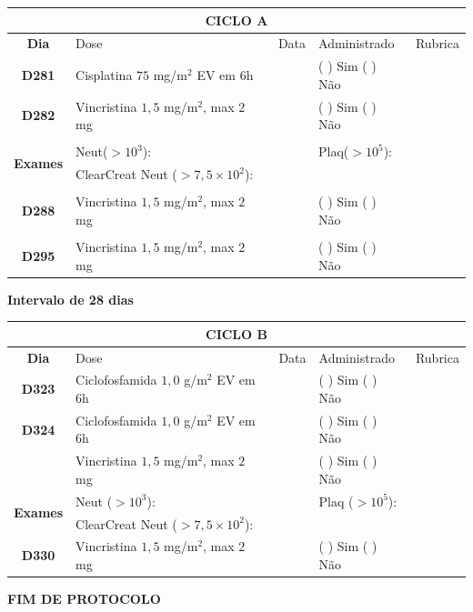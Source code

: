 \documentclass[11pt,a4paper,oldfontcommands]{memoir}
\begin{document}
\begin{center}
\begin{longtable}{p{1cm}p{6cm}|p{1cm}|p{3cm}|p{2.5cm}}
	\hline
	\multicolumn{5}{c}{\textbf{CICLO A}}\\
\hline
    \multicolumn{1}{c|}{\multirow{1}{*}{\textbf{Dia}}}&{Dose}&{Data}&{Administrado}&{Rubrica} \\
    \hline
    \multicolumn{1}{c|}{\multirow{1}{*}{\textbf{D281}}}&{Cisplatina \(75\) mg/m\(^2\) EV em 6h}&&{(  ) Sim (  ) Não}&\\
    \multicolumn{1}{c|}{\multirow{1}{*}{\textbf{D282}}}&{Vincristina \(1,5\) mg/m\(^2\), max \(2\) mg}&&{(  ) Sim (  ) Não}&\\
    \multicolumn{1}{c|}{\multirow{1}{*}{\textbf{}}}&&&&\\
    \hline
    \multicolumn{1}{c|}{\multirow{2}{*}{\textbf{Exames}}}&\multicolumn{2}{l|}{Neut(\(>10^3\)):}&{Plaq(\(>10^5\)):}&\\
    \cline{2-5}
    \multicolumn{1}{c|}{\multirow{2}{*}{{}}}&\multicolumn{2}{l|}{ClearCreat Neut (\(>7,5\times10^2\)):}&{}&{}\\
    \hline
    \\
    \hline
    \multicolumn{1}{c|}{\multirow{1}{*}{\textbf{D288}}}&{Vincristina \(1,5\) mg/m\(^2\), max \(2\) mg}&&{(  ) Sim (  ) Não}&\\
    \hline
    \\
    \hline
    \multicolumn{1}{c|}{\multirow{1}{*}{\textbf{D295}}}&{Vincristina \(1,5\) mg/m\(^2\), max \(2\) mg}&&{(  ) Sim (  ) Não}&\\
    \hline
    \end{longtable}
    \textbf{Intervalo de 28 dias}
    \begin{longtable}{p{1cm}p{6cm}|p{1cm}|p{3cm}|p{2.5cm}}
    \hline
	\multicolumn{5}{c}{\textbf{CICLO B}}\\
	\hline
    \multicolumn{1}{c|}{\multirow{1}{*}{\textbf{Dia}}}&{Dose}&{Data}&{Administrado}&{Rubrica} \\
    \hline
    \multicolumn{1}{c|}{\multirow{1}{*}{\textbf{D323}}}&{Ciclofosfamida \(1,0\) g/m\(^2\) EV em 6h}&&{(  ) Sim (  ) Não}&\\
    \multicolumn{1}{c|}{\multirow{1}{*}{\textbf{D324}}}&{Ciclofosfamida \(1,0\) g/m\(^2\) EV em 6h}&&{(  ) Sim (  ) Não}&\\
    \multicolumn{1}{c|}{\multirow{1}{*}{\textbf{}}}&{Vincristina \(1,5\) mg/m\(^2\), max \(2\) mg}&&{(  ) Sim (  ) Não}&\\
    \hline
    \multicolumn{1}{c|}{\multirow{2}{*}{\textbf{Exames}}}&\multicolumn{2}{l|}{Neut (\(>10^3\)):}&{Plaq (\(>10^5\)):}&\\
    \cline{2-5}
    \multicolumn{1}{c|}{\multirow{2}{*}{{}}}&\multicolumn{2}{l|}{ClearCreat  Neut (\(>7,5\times10^2\)):}&{}&{}\\
    \hline

    \hline
    \multicolumn{1}{c|}{\multirow{1}{*}{\textbf{D330}}}&{Vincristina \(1,5\) mg/m\(^2\), max \(2\) mg}&&{(  ) Sim (  ) Não}&\\
    \hline
\end{longtable}
\textbf{FIM DE PROTOCOLO}

\end{center}
\end{document}
